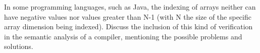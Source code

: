 \documentclass[docid=2017]{comp_test1}
\begin{document}
\vspace{-1em}
\begin{center}
    \ttfamily\small
\end{center}

\begin{center}
    \ttfamily\small
\end{center}

\question
In some programming languages, such as Java, the indexing of arrays neither can have negative values nor values greater than N-1 (with N the size of the specific array dimension being indexed). Discuss the inclusion of this kind of verification in the semantic analysis of a compiler, mentioning the possible problems and solutions.
\end{document}
